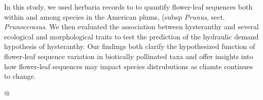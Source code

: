 \documentclass{article}\usepackage[]{graphicx}\usepackage[]{color}
\begin{document}
\noindent In this study, %
we used herbaria records to to quantify flower-leaf sequences both within and among species in the American plums, (subsp \textit{Prunus}, sect. \textit{Prunocerasus}. We then evaluated the association between hysteranthy and several ecological and morphological traits to test the prediction of the hydraulic demand hypothesis of hysteranthy. Our findings both clarify the hypothesized function of flower-leaf sequence variation in biotically pollinated taxa and offer insights into how flower-leaf sequences may impact species distrubutions as cliamte continues to change.




@



\end{document}
